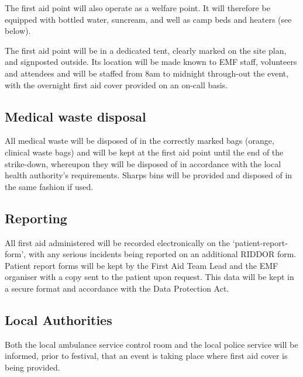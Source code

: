 The first aid point will also operate as a welfare point. It will therefore be
equipped with bottled water, suncream, and well as camp beds and heaters (see
below).

The first aid point will be in a dedicated tent, clearly marked on the site plan, and signposted outside. Its location will be made known to EMF staff, volunteers and attendees and will be staffed from 8am to midnight through-out the event, with the overnight first aid cover provided on an on-call basis.

\subsection{Medical waste disposal}
All medical waste will be disposed of in the correctly marked bags (orange,
clinical waste bags) and will be kept at the first aid point until the end of
the strike-down, whereupon they will be disposed of in accordance with the
local health authority's requirements. Sharps bins will be provided and
disposed of in the same fashion if used.

\subsection{Reporting}
All first aid administered will be recorded electronically on the
‘patient-report-form', with any serious incidents being reported on an
additional RIDDOR form. Patient report forms will be kept by the First Aid Team
Lead and the EMF organiser with a copy sent to the patient upon request. This
data will be kept in a secure format and accordance with the Data Protection
Act.

\subsection{Local Authorities}
Both the local ambulance service control room and the local police service will
be informed, prior to festival, that an event is taking place where first aid
cover is being provided.
